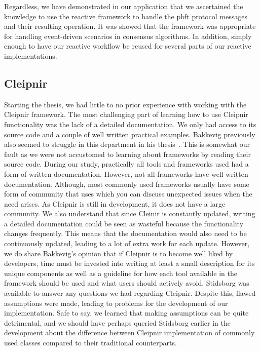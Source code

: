 Regardless, we have demonstrated in our application that we ascertained the knowledge to use the reactive framework to handle the \ac{pbft} protocol messages and their resulting operation. It was showed that the framework was appropriate for handling event-driven scenarios in consensus algorithms. In addition, simply enough to have our reactive workflow be reused for several parts of our reactive implementations. 
\subsection{Cleipnir}
Starting the thesis, we had little to no prior experience with working with the Cleipnir framework. The most challenging part of learning how to use Cleipnir functionality was the lack of a detailed documentation. We only had access to its source code and a couple of well written practical examples. Bakkevig previously also seemed to struggle in this department in his thesis~\cite[p.~43-44]{PAPER:EivindPaper}. This is somewhat our fault as we were not accustomed to learning about frameworks by reading their source code. During our study, practically all tools and frameworks used had a form of written documentation. However, not all frameworks have well-written documentation. Although, most commonly used frameworks usually have some form of community that uses which you can discuss unexpected issues when the need arises. As Cleipnir is still in development, it does not have a large community. We also understand that since Cleinir is constantly updated, writing a detailed documentation could be seen as wasteful because the functionality changes frequently. This means that the documentation would also need to be continuously updated, leading to a lot of extra work for each update. However, we do share Bakkevig’s opinion that if Cleipnir is to become well liked by developers, time must be invested into writing at least a small description for its unique components as well as a guideline for how each tool available in the framework should be used and what users should actively avoid. Stidsborg was available to answer any questions we had regarding Cleipnir.  Despite this, flawed assumptions were made, leading to problems for the development of our implementation. Safe to say, we learned that making assumptions can be quite detrimental, and we should have perhaps queried Stidsborg earlier in the development about the difference between Cleipnir implementation of commonly used classes compared to their traditional counterparts.


\iffalse
